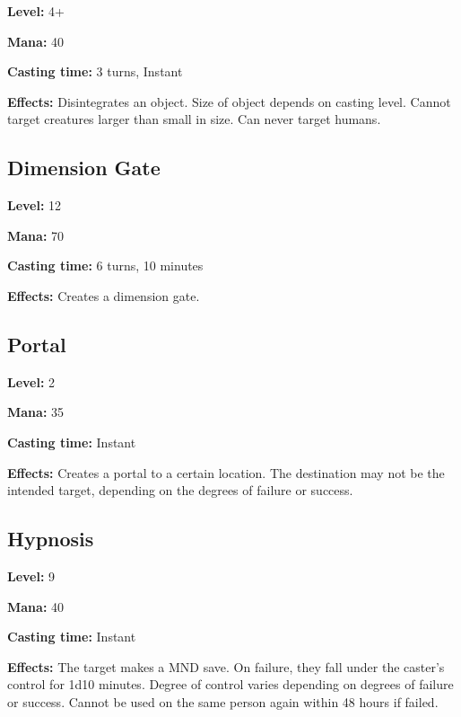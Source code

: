 \documentclass[]{article}
\begin{document}
\textbf{Level:} 4+

\textbf{Mana:} 40

\textbf{Casting time:} 3 turns, Instant

\textbf{Effects:} Disintegrates an object. Size of object depends on
casting level. Cannot target creatures larger than small in size. Can
never target humans.

\subsection{Dimension Gate}\label{dimension-gate}

\textbf{Level:} 12

\textbf{Mana:} 70

\textbf{Casting time:} 6 turns, 10 minutes

\textbf{Effects:} Creates a dimension gate.

\subsection{Portal}\label{portal}

\textbf{Level:} 2

\textbf{Mana:} 35

\textbf{Casting time:} Instant

\textbf{Effects:} Creates a portal to a certain location. The
destination may not be the intended target, depending on the degrees of
failure or success.

\subsection{Hypnosis}\label{hypnosis}

\textbf{Level:} 9

\textbf{Mana:} 40

\textbf{Casting time:} Instant

\textbf{Effects:} The target makes a MND save. On failure, they fall
under the caster's control for 1d10 minutes. Degree of control varies
depending on degrees of failure or success. Cannot be used on the same
person again within 48 hours if failed.
\end{document}
